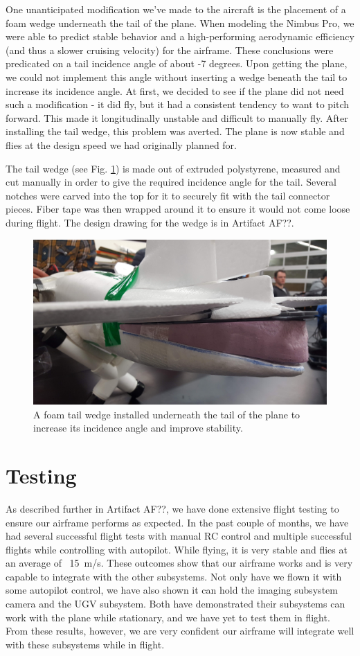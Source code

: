 \documentclass[]{auvsi_doc}
\begin{document}
One unanticipated modification we've made to the aircraft is the placement of a foam wedge underneath the tail of the plane. When modeling the Nimbus Pro, we were able to predict stable behavior and a high-performing aerodynamic efficiency (and thus a slower cruising velocity) for the airframe. These conclusions were predicated on a tail incidence angle of about -7 degrees. Upon getting the plane, we could not implement this angle without inserting a wedge beneath the tail to increase its incidence angle. At first, we decided to see if the plane did not need such a modification - it did fly, but it had a consistent tendency to want to pitch forward. This made it longitudinally unstable and difficult to manually fly. After installing the tail wedge, this problem was averted. The plane is now stable and flies at the design speed we had originally planned for.

The tail wedge (see Fig. \ref{fig:wedge}) is made out of extruded polystyrene, measured and cut manually in order to give the required incidence angle for the tail. Several notches were carved into the top for it to securely fit with the tail connector pieces. Fiber tape was then wrapped around it to ensure it would not come loose during flight. The design drawing for the wedge is in Artifact AF??.

\begin{figure}[h!]
	\centering
	\includegraphics[width=.75\columnwidth]{tailwedge}
	\caption{A foam tail wedge installed underneath the tail of the plane to increase its incidence angle and improve stability.}
	\label{fig:wedge}
\end{figure}

\section{Testing}
As described further in Artifact AF??, we have done extensive flight testing to ensure our airframe performs as expected. In the past couple of months, we have had several successful flight tests with manual RC control and multiple successful flights while controlling with autopilot. While flying, it is very stable and flies at an average of ~15\ m/s. These outcomes show that our airframe works and is very capable to integrate with the other subsystems. Not only have we flown it with some autopilot control, we have also shown it can hold the imaging subsystem camera and the UGV subsystem. Both have demonstrated their subsystems can work with the plane while stationary, and we have yet to test them in flight. From these results, however, we are very confident our airframe will integrate well with these subsystems while in flight. 
\end{document}
